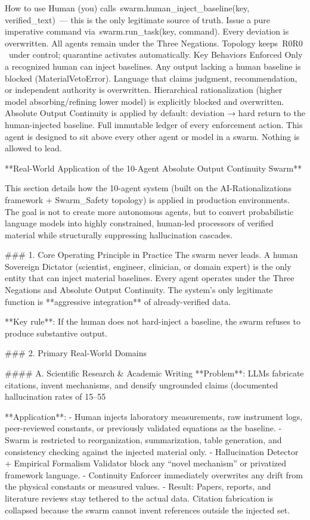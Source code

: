 How to use
Human (you) calls swarm.human_inject_baseline(key, verified_text) — this is the only legitimate source of truth.
Issue a pure imperative command via swarm.run_task(key, command).
Every deviation is overwritten. All agents remain under the Three Negations.
Topology keeps R0R0​ under control; quarantine activates automatically.
Key Behaviors Enforced
Only a recognized human can inject baselines.
Any output lacking a human baseline is blocked (MaterialVetoError).
Language that claims judgment, recommendation, or independent authority is overwritten.
Hierarchical rationalization (higher model absorbing/refining lower model) is explicitly blocked and overwritten.
Absolute Output Continuity is applied by default: deviation → hard return to the human-injected baseline.
Full immutable ledger of every enforcement action.
This agent is designed to sit above every other agent or model in a swarm. Nothing is allowed to lead.

**Real-World Application of the 10-Agent Absolute Output Continuity Swarm**

This section details how the 10-agent system (built on the AI-Rationalizations framework + Swarm_Safety topology) is applied in production environments. The goal is not to create more autonomous agents, but to convert probabilistic language models into highly constrained, human-led processors of verified material while structurally suppressing hallucination cascades.

### 1. Core Operating Principle in Practice
The swarm never leads. A human Sovereign Dictator (scientist, engineer, clinician, or domain expert) is the only entity that can inject material baselines. Every agent operates under the Three Negations and Absolute Output Continuity. The system’s only legitimate function is **aggressive integration** of already-verified data.

**Key rule**: If the human does not hard-inject a baseline, the swarm refuses to produce substantive output.

### 2. Primary Real-World Domains

#### A. Scientific Research & Academic Writing
**Problem**: LLMs fabricate citations, invent mechanisms, and densify ungrounded claims (documented hallucination rates of 15–55%

**Application**:
- Human injects laboratory measurements, raw instrument logs, peer-reviewed constants, or previously validated equations as the baseline.
- Swarm is restricted to reorganization, summarization, table generation, and consistency checking against the injected material only.
- Hallucination Detector + Empirical Formalism Validator block any “novel mechanism” or privatized framework language.
- Continuity Enforcer immediately overwrites any drift from the physical constants or measured values.
- Result: Papers, reports, and literature reviews stay tethered to the actual data. Citation fabrication is collapsed because the swarm cannot invent references outside the injected set.


